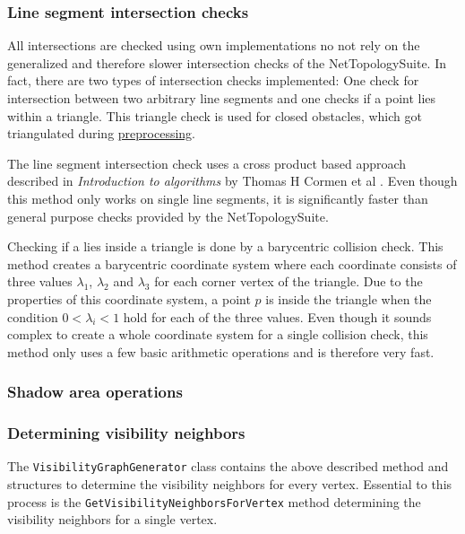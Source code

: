 			\subsubsection{Line segment intersection checks}
			\label{subsubsec:intersection-checks}
			
				All intersections are checked using own implementations no not rely on the generalized and therefore slower intersection checks of the NetTopologySuite.
				In fact, there are two types of intersection checks implemented:
				One check for intersection between two arbitrary line segments and one checks if a point lies within a triangle.
				This triangle check is used for closed obstacles, which got triangulated during \hyperref[subsec:step-1-preprocessing]{preprocessing}.
				
				The line segment intersection check uses a cross product based approach described in \emph{Introduction to algorithms} by Thomas H Cormen et al \cite[1018]{cormen-introduction-to-alg}.
				Even though this method only works on single line segments, it is significantly faster than general purpose checks provided by the NetTopologySuite.
				
				Checking if a  lies inside a triangle is done by a barycentric collision check.
				This method creates a barycentric coordinate system where each coordinate consists of three values $\lambda_1$, $\lambda_2$ and $\lambda_3$ for each corner vertex of the triangle.
				Due to the properties of this coordinate system, a point $p$ is inside the triangle when the condition $0 < \lambda_i < 1$ hold for each of the three values.
				Even though it sounds complex to create a whole coordinate system for a single collision check, this method only uses a few basic arithmetic operations and is therefore very fast.
				
			\subsubsection{Shadow area operations}
				
				
			\subsubsection{Determining visibility neighbors}
			
				The \texttt{VisibilityGraphGenerator} class contains the above described method and structures to determine the visibility neighbors for every vertex.
				Essential to this process is the \texttt{GetVisibilityNeighborsForVertex} method determining the visibility neighbors for a single vertex.
				
